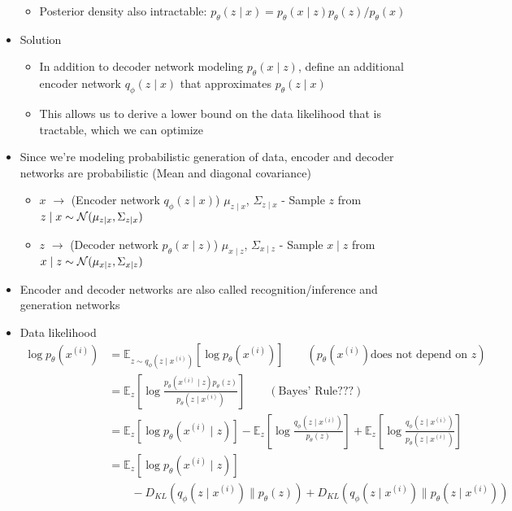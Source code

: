 \begin{itemize}
\begin{itemize}
		\item Posterior density also intractable: $p_\theta (z\mid x) = p_\theta(x\mid z)p_\theta(z)/ p_\theta(x)$
	\end{itemize}
	\item Solution
	\begin{itemize}
		\item In addition to decoder network modeling $p_\theta (x\mid z)$, define an additional encoder network $q_\phi(z\mid x)$ that approximates $p_\theta(z\mid x)$
		\item This allows us to derive a lower bound on the data likelihood that is tractable, which we can optimize
	\end{itemize}
	\item Since we're modeling probabilistic generation of data, encoder and decoder networks are probabilistic (Mean and diagonal covariance)
	\begin{itemize}
		\item $x$ $\rightarrow$ (Encoder network $q_\phi (z\mid x)$) $\mu_{z\mid x}$, $\Sigma_{z\mid x}$ - Sample $z$ from $z\mid x \sim \mc{N}(\mu_{z\mid x}, \Sigma_{z\mid x})$
		\item $z$ $\rightarrow$ (Decoder network $p_\theta (x\mid z)$) $\mu_{x\mid z}$, $\Sigma_{x\mid z}$ - Sample $x\mid z$ from $x\mid z \sim \mc{N}(\mu_{x\mid z}, \Sigma_{x\mid z})$
	\end{itemize}
	\item Encoder and decoder networks are also called recognition/inference and generation networks
	\item Data likelihood
	$$\begin{aligned}
		\log p_\theta\left(x^{(i)}\right) &= \mathbb{E}_{z\sim q_\phi(z\mid x^{(i)})}\left[\log p_\theta \left(x^{(i)}\right)\right] \qquad \left(p_\theta\left(x^{(i)}\right) \text{does not depend on } z\right)\\
	&= \mathbb{E}_{z} \left[\log\frac{p_\theta(x^{(i)} \mid z) p_\theta(z)}{p_\theta(z\mid x^{(i)})}\right] \qquad \left(\text{Bayes' Rule} ???\right)\\
	&= \mathbb{E}_{z}\left[\log p_\theta(x^{(i)} \mid z)\right] - \mathbb{E}_{z}\left[\log\frac{q_\phi\left(z\mid x^{(i)}\right)}{p_\theta(z)}\right] + \mathbb{E}_{z}\left[\log\frac{q_\phi\left(z\mid x^{(i)}\right)}{p_\theta\left(z\mid x^{(i)}\right)}\right] \\
	&=\mathbb{E}_{z}\left[\log p_\theta(x^{(i)} \mid z)\right] \\&\qquad - D_{KL}\left(q_\phi\left(z\mid x^{(i)}\right) \parallel p_\theta(z) \right) + D_{KL}\left(q_\phi\left(z\mid x^{(i)}\right) \parallel p_\theta\left(z\mid x^{(i)}\right)\right)\\

\end{aligned}$$
\end{itemize}
